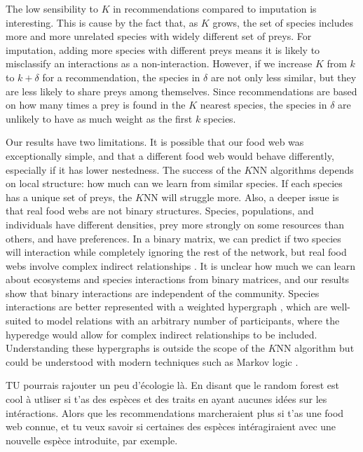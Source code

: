 \documentclass[letterpaper]{article}
\begin{document}
The low sensibility to $K$ in recommendations compared to imputation is
interesting. This is cause by the fact that, as $K$ grows, the set of species
includes more and more unrelated species with widely different set of preys.
For imputation, adding more species with different preys means it is likely to
misclassify an interactions as a non-interaction. However, if we increase $K$
from $k$ to $k + \delta$ for a recommendation, the species in $\delta$ are not
only less similar, but they are less likely to share preys among themselves.
Since recommendations are based on how many times a prey is found in the $K$
nearest species, the species in $\delta$ are unlikely to have as much weight as
the first $k$ species.

Our results have two limitations. It is possible that our food web was
exceptionally simple, and that a different food web would behave differently,
especially if it has lower nestedness. 
The success of the $K$NN algorithms
depends on local structure: how much can we learn from similar species. If each
species has a unique set of preys, the $K$NN will struggle more. Also, a deeper
issue is that real food webs are not binary structures. Species, populations,
and individuals have different densities, prey more strongly on some resources
than others, and have preferences. In a binary matrix, we can predict if two
species will interaction while completely ignoring the rest of the network, but
real food webs involve complex indirect relationships \cite{woo94}. It is
unclear how much we can learn about ecosystems and species interactions from
binary matrices, and our results show that binary interactions are independent
of the community. Species interactions are better represented with a weighted
hypergraph \cite{gao12}, which are well-suited to model relations with an
arbitrary number of participants, where the hyperedge would allow for complex
indirect relationships to be included. Understanding these hypergraphs is
outside the scope of the $K$NN algorithm but could be understood with modern
techniques such as Markov logic \cite{ric06}.

TU pourrais rajouter un peu d'écologie là. En disant que le random forest est cool à utliser si t'as des espèces et des traits en ayant aucunes idées sur les intéractions. Alors que les recommendations marcheraient plus si t'as une food web connue, et tu veux savoir si certaines des espèces intéragiraient avec une nouvelle espèce introduite, par exemple. 
\end{document}
